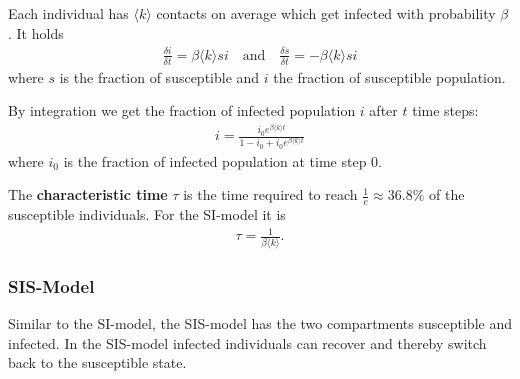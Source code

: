 \documentclass[english]{panikzettel}
\begin{document}
\begin{figure}[ht!]
	\centering
\end{figure}

Each individual has $ \langle k \rangle $ contacts on average which get infected with probability $ \beta $.
It holds
\begin{align*}
	\frac{\delta i}{\delta t} = \beta \langle k \rangle si \quad\text{and}\quad \frac{\delta s}{\delta t} = -\beta \langle k \rangle si
\end{align*}
where $ s $ is the fraction of susceptible and $ i $ the fraction of susceptible population.

By integration we get the fraction of infected population $ i $ after $ t $ time steps:
\begin{align*}
	i = \frac{i_0 e^{\beta \langle k \rangle t}}{1 - i_0 + i_0 e^{\beta \langle k \rangle t}}
\end{align*}
where $ i_0 $ is the fraction of infected population at time step 0.

The \textbf{characteristic time} $ \tau $ is the time required to reach $ \frac{1}{e} \approx 36.8\% $ of the susceptible individuals.
For the SI-model it is
\begin{align*}
	\tau = \frac{1}{\beta \langle k \rangle}.
\end{align*}

\subsubsection{SIS-Model} \label{sec:sis_model}
Similar to the SI-model, the SIS-model has the two compartments susceptible and infected.
In the SIS-model infected individuals can recover and thereby switch back to the susceptible state.

\begin{figure}[ht!]
	\centering
\end{figure}
\end{document}
